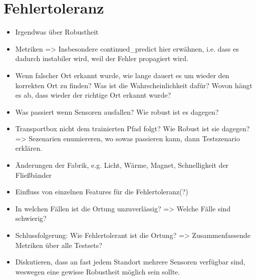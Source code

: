 \section{Fehlertoleranz}
\begin{itemize}
    \item Irgendwas über Robustheit
    \item Metriken => Insbesondere continued\_predict hier erwähnen, i.e. dass es dadurch instabiler wird, weil der Fehler propagiert wird.
    \item Wenn falscher Ort erkannt wurde, wie lange dauert es um wieder den korrekten Ort zu finden? Was ist die Wahrscheinlichkeit dafür? Wovon hängt es ab, dass wieder der richtige Ort erkannt wurde?
    \item Was passiert wenn Sensoren ausfallen? Wie robust ist es dagegen?
    \item Transportbox nicht dem trainierten Pfad folgt? Wie Robust ist sie dagegen? => Sezenarien enumiereren, wo sowas passieren kann, dann Testszenario erklären.
    \item Änderungen der Fabrik, e.g. Licht, Wärme, Magnet, Schnelligkeit der Fließbänder
    \item Einfluss von einzelnen Features für die Fehlertoleranz(?)
    \item In welchen Fällen ist die Ortung unzuverlässig? => Welche Fälle sind schwierig?
    \item Schlussfolgerung: Wie Fehlertolerant ist die Ortung? => Zusammenfassende Metriken über alle Testsets?
    \item Diskutieren, dass an fast jedem Standort mehrere Sensoren verfügbar sind, weswegen eine gewisse Robustheit möglich sein sollte.
\end{itemize}